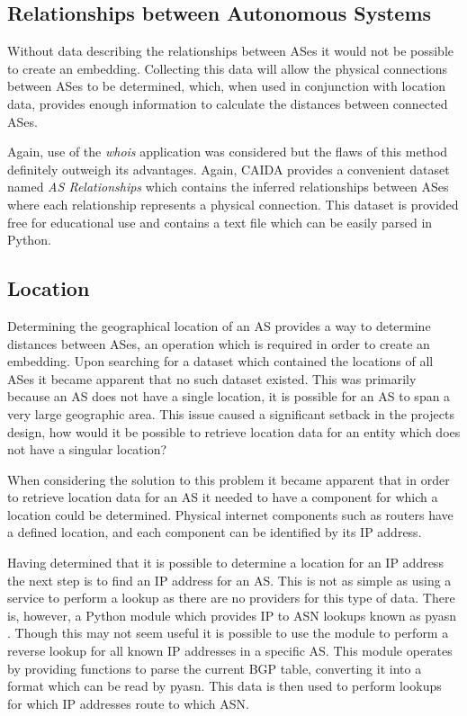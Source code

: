 \subsection{Relationships between Autonomous Systems}
Without data describing the relationships between ASes it would not be possible to create an embedding. Collecting this data will allow the physical connections between ASes to be determined, which, when used in conjunction with location data, provides enough information to calculate the distances between connected ASes.

Again, use of the \textit{whois} application was considered but the flaws of this method definitely outweigh its advantages. Again, CAIDA provides a convenient dataset named \textit{AS Relationships} \cite{relationships_caida_2015} which contains the inferred relationships between ASes where each relationship represents a physical connection. This dataset is provided free for educational use and contains a text file which can be easily parsed in Python. 

\subsection{Location}
Determining the geographical location of an AS provides a way to determine distances between ASes, an operation which is required in order to create an embedding. Upon searching for a dataset which contained the locations of all ASes it became apparent that no such dataset existed. This was primarily because an AS does not have a single location, it is possible for an AS to span a very large geographic area. This issue caused a significant setback in the projects design, how would it be possible to retrieve location data for an entity which does not have a singular location?

When considering the solution to this problem it became apparent that in order to retrieve location data for an AS it needed to have a component for which a location could be determined. Physical internet components such as routers have a defined location, and each component can be identified by its IP address.

Having determined that it is possible to determine a location for an IP address the next step is to find an IP address for an AS. This is not as simple as using a service to perform a lookup as there are no providers for this type of data. There is, however, a Python module which provides IP to ASN lookups known as pyasn \cite{asghari_pyasn_2014}. Though this may not seem useful it is possible to use the module to perform a reverse lookup for all known IP addresses in a specific AS. This module operates by providing functions to parse the current BGP table, converting it into a format which can be read by pyasn. This data is then used to perform lookups for which IP addresses route to which ASN.

